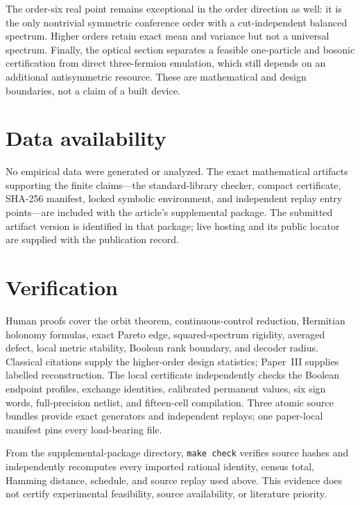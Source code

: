\documentclass[11pt]{article}
\theoremstyle{remark}
\begin{document}
The order-six real point remains exceptional in the order direction as well:
it is the only nontrivial symmetric conference order with a cut-independent
balanced spectrum.  Higher orders retain exact mean and variance but not a
universal spectrum.  Finally, the optical section separates a feasible
one-particle and bosonic certification from direct three-fermion emulation,
which still depends on an additional antisymmetric resource.  These are
mathematical and design boundaries, not a claim of a built device.

\section*{Data availability}

No empirical data were generated or analyzed.  The exact mathematical
artifacts supporting the finite claims---the standard-library checker,
compact certificate, SHA-256 manifest, locked symbolic environment, and
independent replay entry points---are included with the article's
supplemental package.  The submitted artifact version is identified in that
package; live hosting and its public locator are supplied with the publication
record.

\section*{Verification}

Human proofs cover the orbit theorem, continuous-control reduction, Hermitian
holonomy formulas, exact Pareto edge, squared-spectrum rigidity, averaged
defect, local metric stability, Boolean rank boundary, and decoder radius.
Classical citations supply the higher-order design statistics; Paper~III
supplies labelled reconstruction.  The local certificate independently checks
the Boolean endpoint profiles, exchange identities, calibrated permanent
values, six sign words, full-precision netlist, and fifteen-cell compilation.
Three atomic source bundles provide exact generators and independent replays;
one paper-local manifest pins every load-bearing file.

From the supplemental-package directory, \texttt{make check} verifies source
hashes and independently recomputes every imported rational identity, census
total, Hamming distance, schedule, and source replay used above.  This evidence
does not certify experimental feasibility, source availability, or literature
priority.
\end{document}

